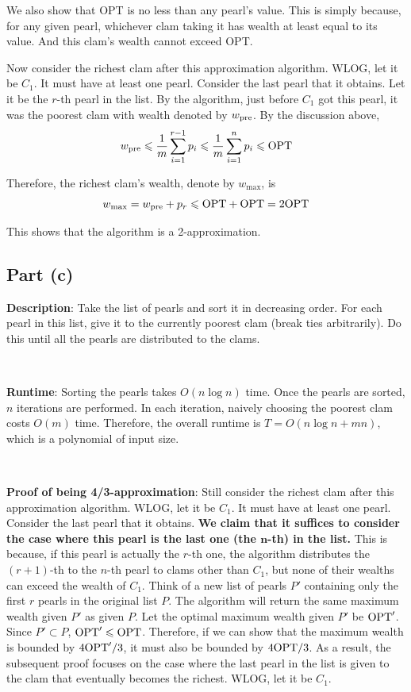 \documentclass{article}
\begin{document}
We also show that OPT is no less than any pearl's value. This is simply because, for any given pearl, whichever clam taking it has wealth at least equal to its value. And this clam's wealth cannot exceed OPT.

Now consider the richest clam after this approximation algorithm. WLOG, let it be $C_1$. It must have at least one pearl. Consider the last pearl that it obtains. Let it be the $r$-th pearl in the list. By the algorithm, just before $C_1$ got this pearl, it was the poorest clam with wealth denoted by $w_{\textup{pre}}$. By the discussion above,
\begin{equation*}
w_{\textup{pre}}\leqslant\frac{1}{m}\sum_{i=1}^{r-1}p_i\leqslant\frac{1}{m}\sum_{i=1}^np_i\leqslant\textup{OPT}
\end{equation*}

Therefore, the richest clam's wealth, denote by $w_{\max}$, is
\begin{equation*}
w_{\max}=w_{\textup{pre}}+p_r\leqslant\textup{OPT}+\textup{OPT}=2\textup{OPT}
\end{equation*}

This shows that the algorithm is a 2-approximation.

\subsection{Part (c)}
\noindent\textbf{Description}: Take the list of pearls and sort it in decreasing order. For each pearl in this list, give it to the currently poorest clam (break ties arbitrarily). Do this until all the pearls are distributed to the clams.

~

\noindent\textbf{Runtime}: Sorting the pearls takes $O(n\log n)$ time. Once the pearls are sorted, $n$ iterations are performed. In each iteration, naively choosing the poorest clam costs $O(m)$ time. Therefore, the overall runtime is $T=O(n\log n+mn)$, which is a polynomial of input size.

~

\noindent\textbf{Proof of being 4/3-approximation}: Still consider the richest clam after this approximation algorithm. WLOG, let it be $C_1$. It must have at least one pearl. Consider the last pearl that it obtains. \textbf{We claim that it suffices to consider the case where this pearl is the last one (the $\bm{n}$-th) in the list.} This is because, if this pearl is actually the $r$-th one, the algorithm distributes the $(r+1)$-th to the $n$-th pearl to clams other than $C_1$, but none of their wealths can exceed the wealth of $C_1$. Think of a new list of pearls $P'$ containing only the first $r$ pearls in the original list $P$. The algorithm will return the same maximum wealth given $P'$ as given $P$. Let the optimal maximum wealth given $P'$ be $\textup{OPT}'$. Since $P'\subset P$, $\textup{OPT}'\leqslant\textup{OPT}$. Therefore, if we can show that the maximum wealth is bounded by $4\textup{OPT}'/3$, it must also be bounded by $4\textup{OPT}/3$. As a result, the subsequent proof focuses on the case where the last pearl in the list is given to the clam that eventually becomes the richest. WLOG, let it be $C_1$.
\end{document}
